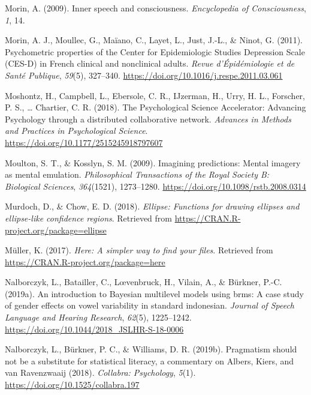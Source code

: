 \documentclass[a4paper,12pt,twoside,onecolumn,openright,final,oldfontcommands]{memoir}
\begin{document}
\leavevmode\hypertarget{ref-morin_inner_2009}{}%
Morin, A. (2009). Inner speech and consciousness. \emph{Encyclopedia of Consciousness}, \emph{1}, 14.

\leavevmode\hypertarget{ref-morin_psychometric_2011}{}%
Morin, A. J., Moullec, G., Maïano, C., Layet, L., Just, J.-L., \& Ninot, G. (2011). Psychometric properties of the Center for Epidemiologic Studies Depression Scale (CES-D) in French clinical and nonclinical adults. \emph{Revue d'Épidémiologie et de Santé Publique}, \emph{59}(5), 327--340. \url{https://doi.org/10.1016/j.respe.2011.03.061}

\leavevmode\hypertarget{ref-moshontz_psychological_2018}{}%
Moshontz, H., Campbell, L., Ebersole, C. R., IJzerman, H., Urry, H. L., Forscher, P. S., \ldots{} Chartier, C. R. (2018). The Psychological Science Accelerator: Advancing Psychology through a distributed collaborative network. \emph{Advances in Methods and Practices in Psychological Science}. \url{https://doi.org/10.1177/2515245918797607}

\leavevmode\hypertarget{ref-moulton_imagining_2009}{}%
Moulton, S. T., \& Kosslyn, S. M. (2009). Imagining predictions: Mental imagery as mental emulation. \emph{Philosophical Transactions of the Royal Society B: Biological Sciences}, \emph{364}(1521), 1273--1280. \url{https://doi.org/10.1098/rstb.2008.0314}

\leavevmode\hypertarget{ref-R-ellipse}{}%
Murdoch, D., \& Chow, E. D. (2018). \emph{Ellipse: Functions for drawing ellipses and ellipse-like confidence regions}. Retrieved from \url{https://CRAN.R-project.org/package=ellipse}

\leavevmode\hypertarget{ref-R-here}{}%
Müller, K. (2017). \emph{Here: A simpler way to find your files}. Retrieved from \url{https://CRAN.R-project.org/package=here}

\leavevmode\hypertarget{ref-nalborczyk_introduction_2019}{}%
Nalborczyk, L., Batailler, C., Lœvenbruck, H., Vilain, A., \& Bürkner, P.-C. (2019a). An introduction to Bayesian multilevel models using brms: A case study of gender effects on vowel variability in standard indonesian. \emph{Journal of Speech Language and Hearing Research}, \emph{62}(5), 1225--1242. \url{https://doi.org/10.1044/2018_JSLHR-S-18-0006}

\leavevmode\hypertarget{ref-nalborczyk_pragmatism_2019}{}%
Nalborczyk, L., Bürkner, P. C., \& Williams, D. R. (2019b). Pragmatism should not be a substitute for statistical literacy, a commentary on Albers, Kiers, and van Ravenzwaaij (2018). \emph{Collabra: Psychology}, \emph{5}(1). \url{https://doi.org/10.1525/collabra.197}
\end{document}
